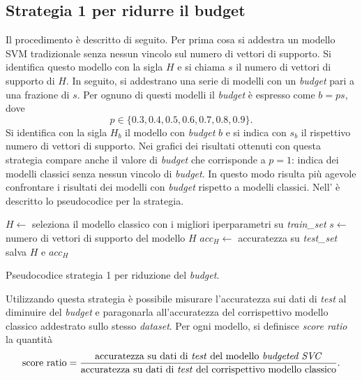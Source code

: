 \subsection{Strategia 1 per ridurre il budget}
Il procedimento è descritto di seguito. Per prima cosa si addestra un modello SVM tradizionale senza nessun vincolo sul numero di vettori di supporto. 
Si identifica questo modello con la sigla $H$ e si chiama $s$ il numero di vettori di supporto di $H$.
In seguito, si addestrano una serie di modelli con un \emph{budget} pari a una frazione di $s$.
Per ognuno di questi modelli il \emph{budget} è espresso come $b=ps$, dove
\begin{equation*}
    p\in\{0.3, 0.4, 0.5, 0.6, 0.7, 0.8, 0.9\}.
\end{equation*}
Si identifica con la sigla $H_b$ il modello con \emph{budget} $b$ e si indica con $s_b$ il rispettivo numero di vettori di supporto.
Nei grafici dei risultati ottenuti con questa strategia compare anche il valore di \emph{budget} che corrisponde a $p=1$: indica dei modelli classici senza nessun vincolo di \emph{budget}. In questo modo risulta più agevole confrontare i risultati dei modelli con \emph{budget} rispetto a modelli classici.
Nell' è descritto lo pseudocodice per la strategia.
\begin{algorithm}[t]
    \SetAlgoLined
    $H \gets$ seleziona il modello classico con i migliori iperparametri su \emph{train\_set}\;
    $s \gets$ numero di vettori di supporto del modello $H$\;
    $acc_H \gets$ accuratezza su \emph{test\_set}\;
    salva $H$ e $acc_H$\;
\caption{Pseudocodice strategia 1 per riduzione del \emph{budget}.}
\label{alg:esperimenti_1}
\end{algorithm}

Utilizzando questa strategia è possibile misurare l'accuratezza sui dati di \emph{test} al diminuire del \emph{budget} e paragonarla all'accuratezza del corrispettivo modello classico addestrato sullo stesso \emph{dataset}.
Per ogni modello, si definisce \emph{score ratio} la quantità
\begin{equation*}
    \text{score ratio} = \frac{\text{accuratezza su dati di \emph{test} del modello \emph{budgeted SVC}}}{\text{accuratezza su dati di \emph{test} del corrispettivo modello classico}}.
\end{equation*}


